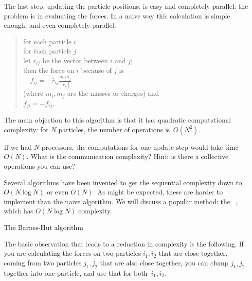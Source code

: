 The last step, updating the particle positions, is easy and completely
parallel: the problem is in evaluating the forces. In a naive way this
calculation is simple enough, and even completely parallel:
\begin{quotation}
  \begin{tabbing}
    for \=each particle $i$\\
    \>for \= each particle $j$\\
    \>\> let $\bar r_{ij}$ be the vector between $i$ and $j$;\\
    \>\> then the force on $i$ because of $j$ is\\
    \>\> $\quad f_{ij} = -\bar r_{ij}\frac{m_im_j}{|r_{ij}|}$\\
    \>\> (where $m_i,m_j$ are the masses or charges) and\\
    \>\> $f_{ji}=-f_{ij}$.
  \end{tabbing}
\end{quotation}
The main objection to this algorithm is that it has quadratic computational
complexity: for $N$ particles, the number of operations is~$O(N^2)$.

\begin{exercise}
  If we had $N$ processors, the computations for one update step would
  take time~$O(N)$.  What is the communication complexity? Hint: is
  there a collective operations you can use?
\end{exercise}

Several algorithms have been invented to get the sequential complexity
down to $O(N\log N)$ or even $O(N)$. As might be expected, these are
harder to implement than the naive algorithm. We will discuss a
popular method: the ~\cite{BarnesHut},
which has $O(N\log N)$ complexity.

 {The Barnes-Hut algorithm}

The basic observation that leads to a reduction in complexity is the
following. If you are calculating the forces on two particles
$i_1,i_2$ that are close together, coming from two particles $j_1,j_2$
that are also close together, you can clump $j_1,j_2$ together into
one particle, and use that for both~$i_1,i_2$.

